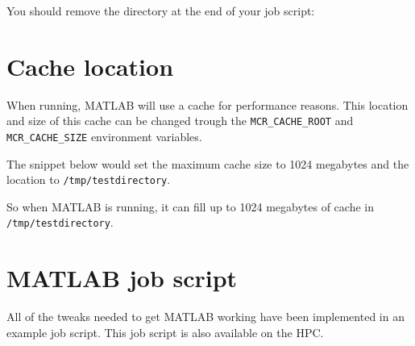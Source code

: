 You should remove the directory at the end of your job script:
\begin{prompt}
\end{prompt}

\section{Cache location}

When running, MATLAB will use a cache for performance reasons. This location
and size of this cache can be changed trough the \verb|MCR_CACHE_ROOT| and
\verb|MCR_CACHE_SIZE| environment variables.

The snippet below would set the maximum cache size to 1024 megabytes and the
location to \verb|/tmp/testdirectory|.

\begin{prompt}
\end{prompt}

So when MATLAB is running, it can fill up to 1024 megabytes of cache in
\verb|/tmp/testdirectory|.

\section{MATLAB job script}

All of the tweaks needed to get MATLAB working have been implemented in an example
job script. This job script is also available on the HPC. %

